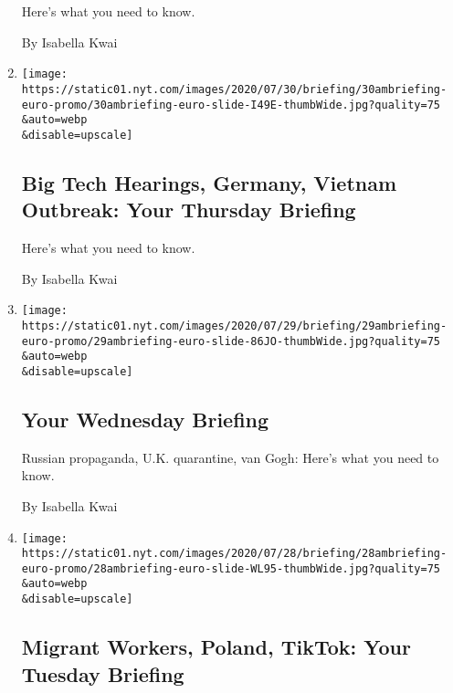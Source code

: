\begin{enumerate}
  Here's what you need to know.

  By Isabella Kwai
\item
  \href{/2020/07/30/briefing/big-tech-hearings-germany-vietnam-outbreak.html}{}

  \texttt{[image: https://static01.nyt.com/images/2020/07/30/briefing/30ambriefing-euro-promo/30ambriefing-euro-slide-I49E-thumbWide.jpg?quality=75\\\&auto=webp\\\&disable=upscale]}

  \hypertarget{big-tech-hearings-germany-vietnam-outbreak-your-thursday-briefing}{%
  \subsection{Big Tech Hearings, Germany, Vietnam Outbreak: Your
  Thursday
  Briefing}\label{big-tech-hearings-germany-vietnam-outbreak-your-thursday-briefing}}

  Here's what you need to know.

  By Isabella Kwai
\item
  \href{/2020/07/29/briefing/russian-propaganda-uk-quarantine-van-gogh.html}{}

  \texttt{[image: https://static01.nyt.com/images/2020/07/29/briefing/29ambriefing-euro-promo/29ambriefing-euro-slide-86JO-thumbWide.jpg?quality=75\\\&auto=webp\\\&disable=upscale]}

  \hypertarget{your-wednesday-briefing}{%
  \subsection{Your Wednesday Briefing}\label{your-wednesday-briefing}}

  Russian propaganda, U.K. quarantine, van Gogh: Here's what you need to
  know.

  By Isabella Kwai
\item
  \href{/2020/07/28/briefing/migrant-workers-poland-tiktok.html}{}

  \texttt{[image: https://static01.nyt.com/images/2020/07/28/briefing/28ambriefing-euro-promo/28ambriefing-euro-slide-WL95-thumbWide.jpg?quality=75\\\&auto=webp\\\&disable=upscale]}

  \hypertarget{migrant-workers-poland-tiktok-your-tuesday-briefing}{%
  \subsection{Migrant Workers, Poland, TikTok: Your Tuesday
  Briefing}\label{migrant-workers-poland-tiktok-your-tuesday-briefing}}


\end{enumerate}
